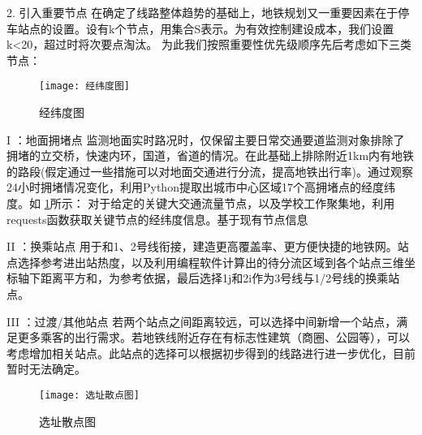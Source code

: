 \documentclass[12pt,a4paper]{mcmthesis}
\begin{document}
2.	引入重要节点
在确定了线路整体趋势的基础上，地铁规划又一重要因素在于停车站点的设置。设有k个节点，用集合S表示。为有效控制建设成本，我们设置k<20，超过时将次要点淘汰。
为此我们按照重要性优先级顺序先后考虑如下三类节点：

\begin{figure}[h!t]
	\centerline{\texttt{[image: 经纬度图]}\quad
	}
	\caption{\song\wuhao
		经纬度图}
	\label{fig:经纬度图}
\end{figure}
I ：地面拥堵点
监测地面实时路况时，仅保留主要日常交通要道监测对象排除了拥堵的立交桥，快速内环，国道，省道的情况。在此基础上排除附近1km内有地铁的路段(假定通过一些措施可以对地面交通进行分流，提高地铁出行率)。通过观察24小时拥堵情况变化，利用Python提取出城市中心区域17个高拥堵点的经度纬度。如 \ref{fig:经纬度图}所示：
对于给定的关键大交通流量节点，以及学校工作聚集地，利用requests函数获取关键节点的经纬度信息。基于现有节点信息

II ：换乘站点
用于和1、2号线衔接，建造更高覆盖率、更方便快捷的地铁网。站点选择参考进出站热度，以及利用编程软件计算出的待分流区域到各个站点三维坐标轴下距离平方和，为参考依据，最后选择1j和2i作为3号线与1/2号线的换乘站点。

III ：过渡/其他站点
若两个站点之间距离较远，可以选择中间新增一个站点，满足更多乘客的出行需求。若地铁线附近存在有标志性建筑（商圈、公园等），可以考虑增加相关站点。此站点的选择可以根据初步得到的线路进行进一步优化，目前暂时无法确定。


\begin{figure}[h!t]
	\centerline{\texttt{[image: 选址散点图]}\quad
	}
	\caption{\song\wuhao
		选址散点图}
	\label{fig:选址散点图}
\end{figure}
\end{document}
